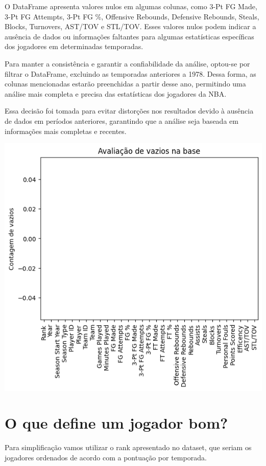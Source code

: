 \documentclass[
]{book}
\begin{document}
O DataFrame apresenta valores nulos em algumas colunas, como 3-Pt FG Made, 3-Pt FG Attempts, 3-Pt FG \%, Offensive Rebounds, Defensive Rebounds, Steals, Blocks, Turnovers, AST/TOV e STL/TOV. Esses valores nulos podem indicar a ausência de dados ou informações faltantes para algumas estatísticas específicas dos jogadores em determinadas temporadas.

Para manter a consistência e garantir a confiabilidade da análise, optou-se por filtrar o DataFrame, excluindo as temporadas anteriores a 1978. Dessa forma, as colunas mencionadas estarão preenchidas a partir desse ano, permitindo uma análise mais completa e precisa das estatísticas dos jogadores da NBA.

Essa decisão foi tomada para evitar distorções nos resultados devido à ausência de dados em períodos anteriores, garantindo que a análise seja baseada em informações mais completas e recentes.

\includegraphics{imagens/2.png}

\hypertarget{o-que-define-um-jogador-bom}{%
\chapter{O que define um jogador bom?}\label{o-que-define-um-jogador-bom}}

Para simplificação vamos utilizar o rank apresentado no dataset, que seriam os jogadores ordenados de acordo com a pontuação por temporada.
\end{document}
